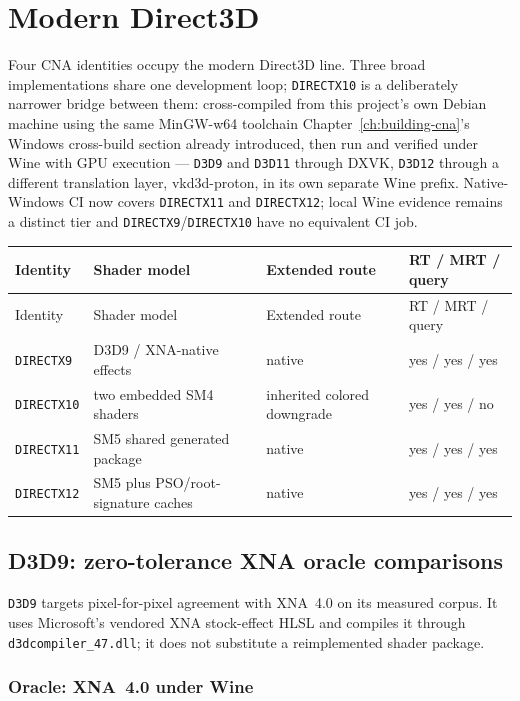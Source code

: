 \chapter{Modern Direct3D}
\label{ch:modern-direct3d}
\label{ch:direct3d-backends}

Four CNA identities occupy the modern Direct3D line.  Three broad implementations share one
development loop; \texttt{DIRECTX10} is a deliberately narrower bridge between them:
cross-compiled from this project's own Debian machine using the same MinGW-w64 toolchain
Chapter~\ref{ch:building-cna}'s Windows cross-build section already introduced, then run and
verified under Wine with GPU execution --- \texttt{D3D9} and \texttt{D3D11} through DXVK,
\texttt{D3D12} through a different translation layer, vkd3d-proton, in its own separate Wine
prefix. Native-Windows CI now covers \texttt{DIRECTX11} and \texttt{DIRECTX12}; local Wine
evidence remains a distinct tier and \texttt{DIRECTX9}/\texttt{DIRECTX10} have no equivalent CI
job.

\begin{longtable}{p{}p{}p{}p{}}
\toprule
Identity & Shader model & Extended route & RT / MRT / query \\
\midrule
\endfirsthead
\toprule
Identity & Shader model & Extended route & RT / MRT / query \\
\midrule
\endhead
\texttt{DIRECTX9} & D3D9 / XNA-native effects & native & yes / yes / yes \\
\texttt{DIRECTX10} & two embedded SM4 shaders & inherited colored downgrade & yes / yes / no \\
\texttt{DIRECTX11} & SM5 shared generated package & native & yes / yes / yes \\
\texttt{DIRECTX12} & SM5 plus PSO/root-signature caches & native & yes / yes / yes \\
\bottomrule
\end{longtable}

\section{D3D9: zero-tolerance XNA oracle comparisons}

\texttt{D3D9} targets pixel-for-pixel agreement with XNA~4.0 on its measured corpus. It uses
Microsoft's vendored XNA stock-effect HLSL and compiles it through
\texttt{d3dcompiler\_47.dll}; it does not substitute a reimplemented shader package.

\subsection{Oracle: XNA~4.0 under Wine}

